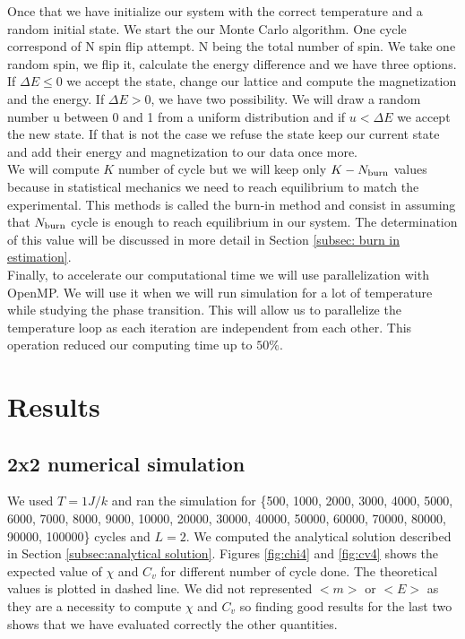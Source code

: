 \documentclass[english,notitlepage,reprint,nofootinbib]{revtex4-2}  %
\begin{document}
	Once that we have initialize our system with the correct temperature and a random initial
	state. We start the our Monte Carlo algorithm. One cycle correspond of N spin flip attempt. 
	N being the total number of spin. We take one random spin, we flip it, calculate the 
	energy difference and we have three options. If $\Delta E \le 0 $ we accept the state, 
	change our lattice and compute the magnetization and the energy. If $\Delta E > 0$, we have
	two possibility. We will draw a random number u between 0 and 1 from a uniform distribution
	and if $u < \Delta E$ we accept the new state. If that is not the case we refuse the state
	keep our current state and add their energy and magnetization to our data once more. \\
	
	We will compute $K$ number of cycle but we will keep only $K - N_{\rm burn}$ values 
	because in statistical mechanics we need to reach equilibrium to match the experimental. 
	This methods is called the burn-in method and consist in assuming that $N_{\rm burn}$ cycle
	is enough to reach equilibrium in our system. The determination of this value will be 
	discussed in more detail in Section \ref{subsec: burn in estimation}. \\
	
	Finally, to accelerate our computational time we will use parallelization with OpenMP. We 
	will use it when we will run simulation for a lot of temperature while studying the 
	phase transition. This will allow us to parallelize the temperature loop as each iteration
	are independent from each other. This operation reduced our computing time up to $50\%$. 

	\section{Results}\label{sec:results}
	\subsection{2x2 numerical simulation}\label{subsec: 2x2 numerical}
	We used $T=1 J/k$ and ran the simulation for \{500, 1000, 2000, 3000, 4000, 5000, 6000, 
	7000, 8000, 9000, 10000, 20000, 30000, 40000, 50000, 60000, 70000, 80000, 90000, 100000\}
	cycles and $L=2$. We computed the analytical solution described in Section \ref{subsec:analytical solution}. 
	Figures \ref{fig:chi4} and \ref{fig:cv4} shows the expected value of $\chi$ and $C_v$ for different number of cycle done. The theoretical values is plotted in dashed line. We did
	not represented $<m>$ or $<E>$ as they are a necessity to compute $\chi$ and $C_v$ so 
	finding good results for the last two shows that we have evaluated correctly the other
	quantities. 
	
\end{document}
